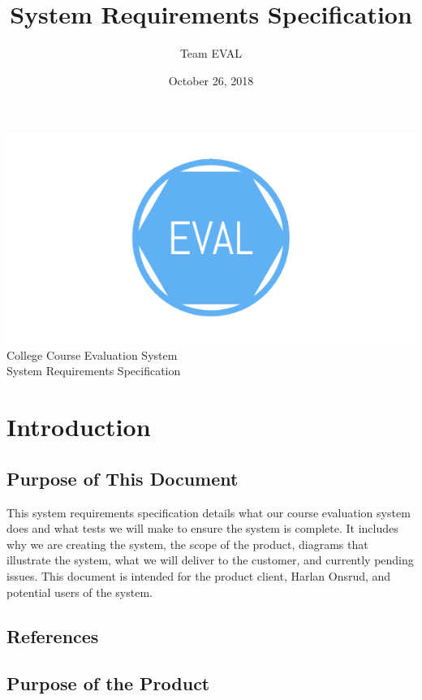 \documentclass{article}
\title{System Requirements Specification}
\author{Team EVAL}
\date{October 26, 2018}
\begin{document}
\maketitle

\newpage

\begin{center}
{\includegraphics[scale=.3]{team_logo.png}}\\ \bigskip
{\LARGE College Course Evaluation System }\\ \medskip
{\large System Requirements Specification }\\
\end{center}

\tableofcontents

\newpage

\section{Introduction}
\subsection{Purpose of This Document}

This system requirements specification details what our course evaluation system does and what tests we will make to ensure the system is complete. It includes why we are creating the system, the scope of the product, diagrams that illustrate the system, what we will deliver to the customer, and currently pending issues. This document is intended for the product client, Harlan Onsrud, and potential users of the system.

\subsection{References}
\subsection{Purpose of the Product}
\end{document}
